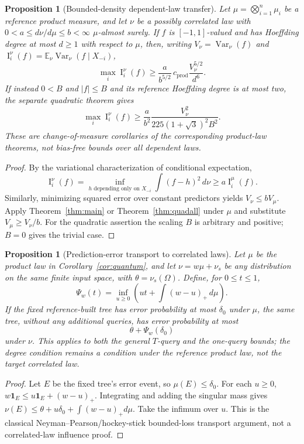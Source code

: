 \documentclass[11pt]{article}
\numberwithin{equation}{section}
\newtheorem{proposition}[theorem]{Proposition}
\theoremstyle{remark}
\newcommand{\Inf}{\operatorname{I}}
\newcommand{\cprod}{c_{\mathrm{prod}}}
\begin{document}
\begin{proposition}[Bounded-density dependent-law transfer]\label{prop:corrdens}
Let $\mu=\bigotimes_{i=1}^n\mu_i$ be a reference product measure,
and let $\nu$ be a possibly correlated law with
\(0<a\le d\nu/d\mu\le b<\infty\) $\mu$-almost surely.
If $f$ is $[-1,1]$-valued and has Hoeffding degree at most $d\ge1$
\emph{with respect to $\mu$}, then, writing
$V_\nu=\operatorname{Var}_\nu(f)$ and
$\Inf_i^\nu(f)=\mathbb E_\nu\operatorname{Var}_\nu(f\mid X_{-i})$,
\[
 \max_i\Inf_i^\nu(f)\ge
 \frac{a}{b^{5/2}}\,\cprod\frac{V_\nu^{5/2}}{d^6}.
\]
If instead $0<B$ and $|f|\le B$ and its reference Hoeffding degree is at most
two, the separate quadratic theorem gives
\[
 \max_i\Inf_i^\nu(f)\ge
 \frac{a}{b^2}\frac{V_\nu^2}
 {225(1+\sqrt3)^2 B^2}.
\]
These are change-of-measure corollaries of the corresponding
product-law theorems, not bias-free bounds over all dependent laws.
\end{proposition}
\begin{proof}
By the variational characterization of conditional expectation,
\[
 \Inf_i^\nu(f)
 =\inf_{h\text{ depending only on }X_{-i}}
    \int(f-h)^2\,d\nu
 \ge a\Inf_i^\mu(f).
\]
Similarly, minimizing squared error over constant predictors yields
$V_\nu\le bV_\mu$. Apply Theorem~\ref{thm:main} or
Theorem~\ref{thm:quadall} under $\mu$ and substitute
$V_\mu\ge V_\nu/b$. For the quadratic assertion the scaling
$B$ is arbitrary and positive; $B=0$ gives the trivial case.
\end{proof}

\begin{proposition}[Prediction-error transport to correlated laws]\label{prop:corrquant}
Let $\mu$ be the product law in Corollary~\ref{cor:quantum}, and
let $\nu=w\mu+\nu_s$ be \emph{any} distribution on the same finite
input space, with $\theta=\nu_s(\Omega)$.
Define, for $0\le t\le1$,
\[
 \Psi_w(t)=\inf_{u\ge0}\left(ut+\int(w-u)_+\,d\mu\right).
 \]
If the fixed reference-built tree has error probability at most
$\delta_0$ under $\mu$, the \emph{same} tree, without any additional
queries, has error probability at most
\[
 \theta+\Psi_w(\delta_0)
\]
under $\nu$. This applies to both the general $T$-query and the
one-query bounds; the degree condition remains a condition under the
reference product law, not the target correlated law.
\end{proposition}
\begin{proof}
Let $E$ be the fixed tree's error event, so $\mu(E)\le\delta_0$.
For each $u\ge0$,
$w\mathbf 1_E\le u\mathbf 1_E+(w-u)_+$.
Integrating and adding the singular mass gives
$\nu(E)\le\theta+u\delta_0+\int(w-u)_+d\mu$.
Take the infimum over $u$. This is the classical
Neyman--Pearson/hockey-stick bounded-loss transport argument,
not a correlated-law influence proof.
\end{proof}
\end{document}
